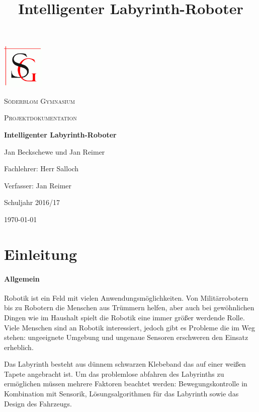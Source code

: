 \documentclass[12pt]{article}
\title{Intelligenter Labyrinth-Roboter}
\begin{document}
\begin{titlepage}
	\centering
	\includegraphics[width=0.15\textwidth]{images/sg-logo.png}\par\vspace{1cm}
	{\scshape\LARGE Söderblom Gymnasium \par}
	\vspace{1cm}
	{\scshape\Large Projektdokumentation\par}
	\vspace{1.5cm}
	{\huge\bfseries Intelligenter Labyrinth-Roboter\par}
	\vspace{1.5cm}
	{\Large Jan Beckschewe und Jan Reimer \par}
	\vspace{1.5cm}
	Fachlehrer: Herr Salloch \par
    \vspace{0.5cm}
    Verfasser: Jan Reimer \par
    \vspace{1cm}
	Schuljahr 2016/17 \par
    
	\vfill

	{\large \today\par}
\end{titlepage}
\tableofcontents
\thispagestyle{empty}
\restoregeometry
\newpage
\setcounter{page}{3}
\section{Einleitung}
\paragraph{Allgemein} Robotik ist ein Feld mit vielen Anwendungsmöglichkeiten. Von Militärrobotern bis zu Robotern die Menschen aus Trümmern helfen, aber auch bei gewöhnlichen Dingen wie im Haushalt spielt die Robotik eine immer größer werdende Rolle. Viele Menschen sind an Robotik interessiert, jedoch gibt es Probleme die im Weg stehen: ungeeignete Umgebung und ungenaue Sensoren erschweren den Einsatz erheblich.  

Das Labyrinth besteht aus dünnem schwarzen Klebeband das auf einer weißen Tapete angebracht ist. Um das problemlose abfahren des Labyrinths zu ermöglichen müssen mehrere Faktoren beachtet werden: Bewegungskontrolle in Kombination mit Sensorik, Lösungsalgorithmen für das Labyrinth sowie das Design des Fahrzeugs.
\end{document}

